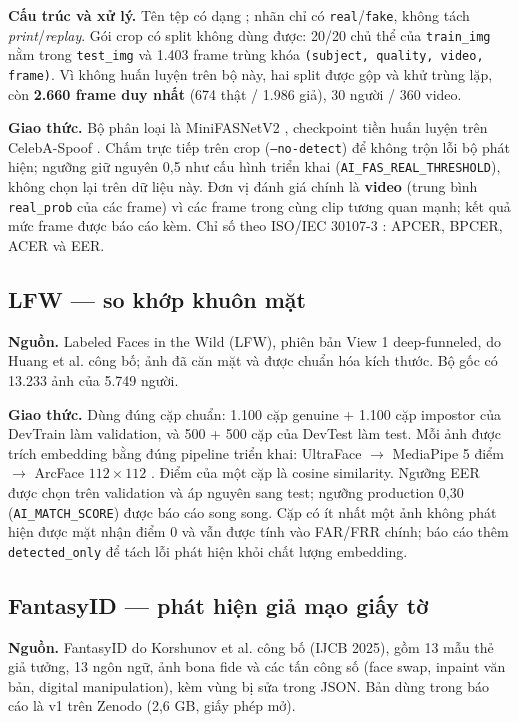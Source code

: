 \documentclass[12pt,a4paper]{article}
\begin{document}
\textbf{Cấu trúc và xử lý.} Tên tệp có dạng
; nhãn chỉ có \texttt{real}/\texttt{fake},
không tách \textit{print}/\textit{replay}. Gói crop có split không dùng được: 20/20 chủ thể của
\texttt{train\_img} nằm trong \texttt{test\_img} và 1.403 frame trùng khóa
\texttt{(subject, quality, video, frame)}. Vì không huấn luyện trên bộ này, hai split được gộp và
khử trùng lặp, còn \textbf{2.660 frame duy nhất} (674 thật / 1.986 giả), 30 người / 360 video.

\textbf{Giao thức.} Bộ phân loại là MiniFASNetV2 \cite{minivision2020silent}, checkpoint tiền huấn luyện
trên CelebA-Spoof \cite{zhang2020celeba}. Chấm trực tiếp trên crop (\texttt{--no-detect}) để không trộn lỗi bộ phát hiện;
ngưỡng giữ nguyên 0,5 như cấu hình triển khai (\texttt{AI\_FAS\_REAL\_THRESHOLD}), không chọn lại
trên dữ liệu này. Đơn vị đánh giá chính là \textbf{video} (trung bình \texttt{real\_prob} của các frame)
vì các frame trong cùng clip tương quan mạnh; kết quả mức frame được báo cáo kèm. Chỉ số theo
ISO/IEC 30107-3 \cite{iso30107}: APCER, BPCER, ACER và EER.

\subsection{LFW --- so khớp khuôn mặt}
\textbf{Nguồn.} Labeled Faces in the Wild (LFW), phiên bản View 1 deep-funneled, do Huang et al.
\cite{huang2008lfw} công bố; ảnh đã căn mặt và được chuẩn hóa kích thước. Bộ gốc có 13.233 ảnh của
5.749 người.

\textbf{Giao thức.} Dùng đúng cặp chuẩn: 1.100 cặp genuine + 1.100 cặp impostor của DevTrain làm
validation, và 500 + 500 cặp của DevTest làm test. Mỗi ảnh được trích embedding bằng đúng pipeline
triển khai: UltraFace \cite{linzaer2019ultraface} $\rightarrow$ MediaPipe 5 điểm
\cite{lugaresi2019mediapipe} $\rightarrow$ ArcFace $112\times112$ \cite{deng2019arcface}. Điểm của
một cặp là cosine similarity. Ngưỡng EER được chọn trên validation và áp nguyên sang test; ngưỡng
production 0,30 (\texttt{AI\_MATCH\_SCORE}) được báo cáo song song. Cặp có ít nhất một ảnh không phát
hiện được mặt nhận điểm 0 và vẫn được tính vào FAR/FRR chính; báo cáo thêm \texttt{detected\_only}
để tách lỗi phát hiện khỏi chất lượng embedding.

\subsection{FantasyID --- phát hiện giả mạo giấy tờ}
\textbf{Nguồn.} FantasyID do Korshunov et al. \cite{korshunov2025fantasyid} công bố (IJCB 2025),
gồm 13 mẫu thẻ giả tưởng, 13 ngôn ngữ, ảnh bona fide và các tấn công số (face swap, inpaint văn bản,
digital manipulation), kèm vùng bị sửa trong JSON. Bản dùng trong báo cáo là v1 trên Zenodo
(2,6 GB, giấy phép mở).
\end{document}
